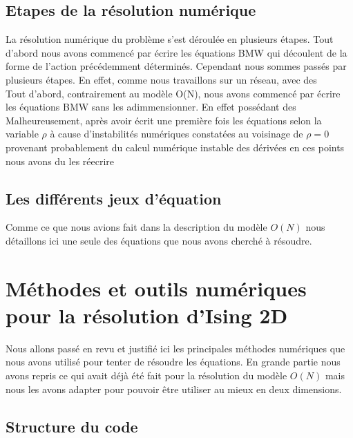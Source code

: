 \documentclass[10pt]{article}
\begin{document}
\begin{multicols}{2}
\vspace*{11pt}

\vspace*{11pt}
\subsection{Etapes de la résolution numérique}
La résolution numérique du problème s'est déroulée en plusieurs étapes. Tout d'abord nous avons commencé par écrire les équations BMW qui découlent de la forme de l'action précédemment déterminés. Cependant nous sommes passés par plusieurs étapes. En effet, comme nous travaillons sur un réseau, avec des  \\

Tout d'abord, contrairement au modèle O(N), nous avons commencé par écrire les équations BMW sans les adimmensionner. En effet possédant des  \\

Malheureusement, après avoir écrit une première fois les équations selon la variable $\rho$ à cause d'instabilités numériques constatées au voisinage de $\rho = 0$ provenant probablement du calcul numérique instable des dérivées en ces points nous avons du les réecrire  


\subsection{Les différents jeux d'équation}

Comme ce que nous avions fait dans la description du modèle $O(N)$ nous détaillons ici une seule des équations que nous avons cherché à résoudre.

\vspace*{22pt}

\section{Méthodes et outils numériques pour la résolution d'Ising 2D}

Nous allons passé en revu et justifié ici les principales méthodes numériques que nous avons utilisé pour tenter de résoudre les équations. En grande partie nous avons repris ce qui avait déjà été fait pour la résolution du modèle $O(N)$ mais nous les avons adapter pour pouvoir être utiliser au mieux en deux dimensions.


\subsection{Structure du code}




\end{multicols}
\end{document}
